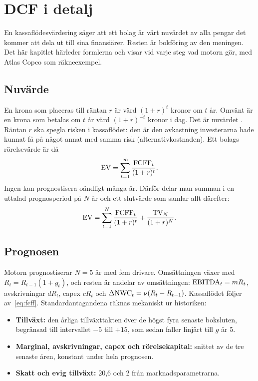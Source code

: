 \section{DCF i detalj}
\label{sec:dcf}

En kassaflödesvärdering  säger att ett bolag är värt nuvärdet av
alla pengar det kommer att dela ut till sina finansiärer. Resten är bokföring av den meningen.
Det här kapitlet härleder formlerna och visar vid varje steg vad motorn gör, med Atlas Copco
som räkneexempel.

\subsection{Nuvärde}

En krona som placeras till räntan $r$ är värd $(1+r)^t$ kronor om $t$ år. Omvänt är en krona
som betalas om $t$ år värd $(1+r)^{-t}$ kronor i dag. Det är nuvärdet .
Räntan $r$ ska spegla risken i kassaflödet: den är den avkastning investerarna hade kunnat få
på något annat med samma risk (alternativkostnaden). Ett bolags rörelsevärde är då
\begin{equation}
  \mathrm{EV} = \sum_{t=1}^{\infty} \frac{\mathrm{FCFF}_t}{(1+r)^t}.
  \label{eq:ev-oandlig}
\end{equation}
Ingen kan prognostisera oändligt många år. Därför delar man summan i en uttalad prognosperiod
på $N$ år och ett slutvärde  som samlar allt därefter:
\begin{equation}
  \mathrm{EV} = \sum_{t=1}^{N} \frac{\mathrm{FCFF}_t}{(1+r)^t} + \frac{\mathrm{TV}_N}{(1+r)^N}.
  \label{eq:ev}
\end{equation}

\subsection{Prognosen}
\label{sec:prognos}

Motorn prognostiserar $N = 5$ år med fem drivare. Omsättningen växer med $R_t = R_{t-1}(1+g_t)$,
och resten är andelar av omsättningen: $\mathrm{EBITDA}_t = m R_t$, avskrivningar $d R_t$, capex
$c R_t$ och $\Delta\mathrm{NWC}_t = \nu (R_t - R_{t-1})$. Kassaflödet följer av~\eqref{eq:fcff}.
Standardantagandena räknas mekaniskt ur historiken:

\begin{itemize}
  \item \textbf{Tillväxt:} den årliga tillväxttakten  över
    de högst fyra senaste boksluten, begränsad till intervallet $-5$ till $+15$\pct, som sedan
    faller linjärt till $g$ år 5.
  \item \textbf{Marginal, avskrivningar, capex och rörelsekapital:} snittet av de tre senaste
    åren, konstant under hela prognosen.
  \item \textbf{Skatt och evig tillväxt:} 20,6\pct{} och 2\pct{} från marknadsparametrarna.
\end{itemize}

